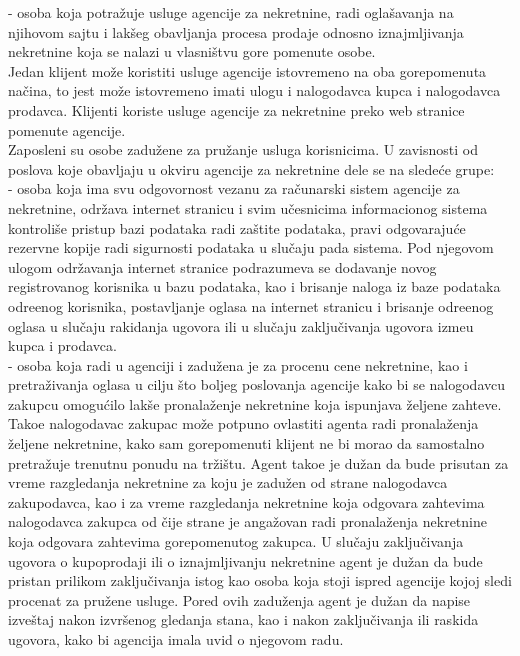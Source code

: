 \documentclass{article}
\begin{document}
 - osoba koja potra\v {z}uje usluge agencije za nekretnine, radi ogla\v {s}avanja na njihovom sajtu i lak\v {s}eg obavljanja procesa prodaje odnosno iznajmljivanja nekretnine koja se nalazi u vlasni\v {s}tvu gore pomenute osobe.\\

Jedan klijent mo\v {z}e koristiti usluge agencije istovremeno na oba gorepomenuta na\v {c}ina, to jest mo\v {z}e istovremeno imati ulogu i nalogodavca kupca i nalogodavca prodavca. Klijenti koriste usluge agencije za nekretnine preko web stranice pomenute agencije.\\

\indent Zaposleni su osobe zadu\v {z}ene za pru\v {z}anje usluga korisnicima. U zavisnosti od poslova koje obavljaju u okviru agencije za nekretnine dele se na slede\' ce grupe:\\

 - osoba koja ima svu odgovornost vezanu za ra\v {c}unarski sistem agencije za nekretnine, odr\v {z}ava internet stranicu i svim u\v {c}esnicima informacionog sistema kontroli\v {s}e pristup bazi podataka radi za\v {s}tite podataka, pravi odgovaraju\' ce rezervne kopije radi sigurnosti podataka u slu\v {c}aju pada sistema. Pod njegovom ulogom odr\v {z}avanja internet stranice podrazumeva se dodavanje novog registrovanog korisnika u bazu podataka, kao i brisanje naloga iz baze podataka odre\dj enog korisnika, postavljanje oglasa na internet stranicu i brisanje odre\dj enog oglasa u slu\v {c}aju rakidanja ugovora ili u slu\v {c}aju zaklju\v {c}ivanja ugovora izme\dj u kupca i prodavca.\\

 - osoba koja radi u agenciji i zadu\v {z}ena je za procenu cene nekretnine, kao i pretra\v {z}ivanja oglasa u cilju \v {s}to boljeg poslovanja agencije kako bi se nalogodavcu zakupcu omogu\' cilo lak\v {s}e pronala\v {z}enje nekretnine koja ispunjava \v {z}eljene zahteve. Tako\dj e nalogodavac zakupac mo\v {z}e potpuno ovlastiti agenta radi pronala\v {z}enja \v {z}eljene nekretnine, kako sam gorepomenuti klijent ne bi morao da samostalno pretra\v {z}uje trenutnu ponudu na tr\v {z}i\v {s}tu. Agent tako\dj e je du\v {z}an da bude prisutan za vreme razgledanja nekretnine za koju je zadu\v {z}en od strane nalogodavca zakupodavca, kao i za vreme razgledanja nekretnine koja odgovara zahtevima nalogodavca zakupca od \v {c}ije strane je anga\v {z}ovan radi pronala\v {z}enja nekretnine koja odgovara zahtevima gorepomenutog zakupca. U slu\v {c}aju zaklju\v {c}ivanja ugovora o kupoprodaji ili o iznajmljivanju nekretnine agent je du\v {z}an da bude pristan prilikom zaklju\v {c}ivanja istog kao osoba koja stoji ispred agencije kojoj sledi procenat za pru\v {z}ene usluge. Pored ovih zadu\v {z}enja agent je du\v {z}an da napise izve\v {s}taj nakon izvr\v {s}enog gledanja stana, kao i nakon zaklju\v {c}ivanja ili raskida ugovora, kako bi agencija imala uvid o njegovom radu.\\
\end{document}

